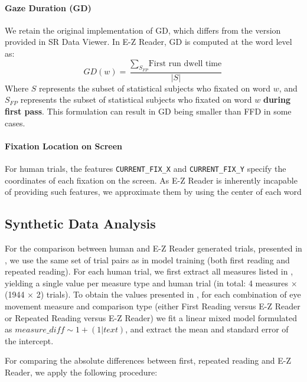 \paragraph{Gaze Duration (GD)} We retain the original implementation of GD, which differs from the version provided in SR Data Viewer. In \mbox{E-Z} Reader, GD is computed at the word level as: $$GD(w)=\frac{\sum_{S_{FP}}{\text{First run dwell time}}}{|S|}$$
Where $S$ represents the subset of statistical subjects who fixated on word $w$, and $S_{FP}$ represents the subset of statistical subjects who fixated on word $w$ \textbf{during first pass}.
This formulation can result in GD being smaller than FFD in some cases.

\paragraph{Fixation Location on Screen} For human trials, the features \texttt{CURRENT\_FIX\_X} and \texttt{CURRENT\_FIX\_Y} specify the coordinates of each fixation on the screen. As \mbox{E-Z} Reader is inherently incapable of providing such features, we approximate them by using the center of each word 







\subsection{Synthetic Data Analysis}
For the comparison between human and \mbox{E-Z} Reader generated trials, presented in , we use the same set of trial pairs as in model training (both first reading and repeated reading). For each human trial, we first extract all measures listed in , yielding a single value per measure type and human trial (in total: 4 measures $\times$ (1944 $\times$ 2) trials).
To obtain the values presented in , for each combination of eye movement measure and comparison type (either First Reading versus \mbox{E-Z} Reader or Repeated Reading versus \mbox{E-Z} Reader) we fit a linear mixed model formulated as $measure\_diff \sim 1 + (1|text)$, and extract the mean and standard error of the intercept.

For comparing the absolute differences between first, repeated reading and \mbox{E-Z} Reader, we apply the following procedure:

